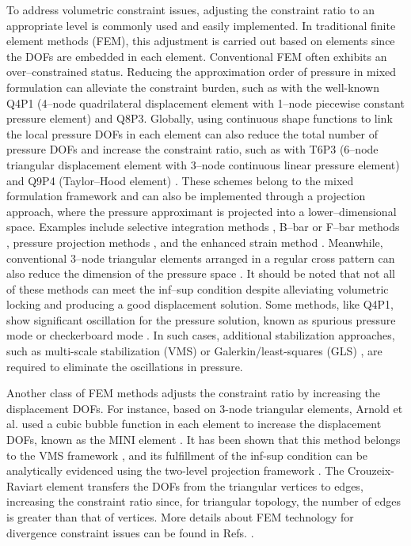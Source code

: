 To address volumetric constraint issues, adjusting the constraint ratio to an appropriate level is commonly used and easily implemented.
In traditional finite element methods (FEM), this adjustment is carried out based on elements since the DOFs are embedded in each element.
Conventional FEM often exhibits an over--constrained status.
Reducing the approximation order of pressure in mixed formulation can alleviate the constraint burden, such as with the well-known Q4P1 (4--node quadrilateral displacement element with 1--node piecewise constant pressure element) and Q8P3.
Globally, using continuous shape functions to link the local pressure DOFs in each element can also reduce the total number of pressure DOFs and increase the constraint ratio, such as with T6P3 (6--node triangular displacement element with 3--node continuous linear pressure element) and Q9P4 (Taylor--Hood element) \cite{hood1974}.
These schemes belong to the mixed formulation framework and can also be implemented through a projection approach, where the pressure approximant is projected into a lower--dimensional space.
Examples include selective integration methods \cite{malkus1978,shilt2020}, B--bar or F--bar methods \cite{simo1990,broccardo2009,coombs2018,saloustros2021,rodriguez2023}, pressure projection methods \cite{simo1985,dohrmann2004}, and the enhanced strain method \cite{lovadina2003}.
Meanwhile, conventional 3--node triangular elements arranged in a regular cross pattern can also reduce the dimension of the pressure space \cite{bathe2001}.
It should be noted that not all of these methods can meet the inf--sup condition despite alleviating volumetric locking and producing a good displacement solution.
Some methods, like Q4P1, show significant oscillation for the pressure solution, known as spurious pressure mode or checkerboard mode \cite{bathe2001}.
In such cases, additional stabilization approaches, such as multi-scale stabilization (VMS) \cite{hughes1995,masud2005,rossi2021,karabelas2022} or Galerkin/least-squares (GLS) \cite{hughes1986}, are required to eliminate the oscillations in pressure.

Another class of FEM methods adjusts the constraint ratio by increasing the displacement DOFs. For instance, based on 3-node triangular elements, Arnold et al. used a cubic bubble function in each element to increase the displacement DOFs, known as the MINI element \cite{arnold1984,auricchio2005}. It has been shown that this method belongs to the VMS framework \cite{quarteroni1994}, and its fulfillment of the inf-sup condition can be analytically evidenced using the two-level projection framework \cite{brezzi}. The Crouzeix-Raviart element \cite{crouzeix1973} transfers the DOFs from the triangular vertices to edges, increasing the constraint ratio since, for triangular topology, the number of edges is greater than that of vertices. More details about FEM technology for divergence constraint issues can be found in Refs. \cite{hughes2000,bathe1996,brink1996}.


